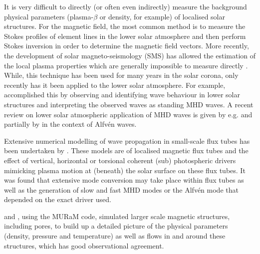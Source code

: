     It is very difficult to directly (or often even indirectly) measure the background physical parameters (plasma-$\beta$ or density, for example) of localised solar structures.
    For the magnetic field, the  most common method is to measure the Stokes profiles of element lines in the lower solar atmosphere and then perform Stokes inversion in order to determine the magnetic field vectors.
    More recently, the development of solar magneto-seismology (SMS) has allowed the estimation of the local plasma properties which are generally impossible to measure directly \citep{Andries2009,Ruderman2009}.
    While, this technique has been used for many years in the solar corona, only recently has it been applied to the lower solar atmosphere.
    For example, \citet{PMHDW} accomplished this by observing and identifying wave behaviour in lower solar structures and interpreting the observed waves as standing MHD waves.
    A recent review on lower solar atmospheric application of MHD waves is given by e.g. \citet{Banerjee2007} and partially by \citet{Mathioudakis2013} in the context of Alfv{\'e}n waves.
    
    Extensive numerical modelling of wave propagation in small-scale flux tubes has been undertaken by \citet{khomenko,hasan2008dynamics,fedun2,fedun1,2011ApJ...730L..24K,2011AnGeo..29..883S,Vigeesh2012,Wedemeyer2012,Mumford2015}.
    These models are of localised magnetic flux tubes and the effect of vertical, horizontal or torsional coherent (sub) photospheric drivers mimicking plasma motion at (beneath) the solar surface on these flux tubes.
    It was found that extensive mode conversion may take place within flux tubes as well as the generation of slow and fast MHD modes or the Alfv{\'e}n mode that depended on the exact driver used.   
    
    \citet{vogler} and \citet{cameron}, using the MURaM code, simulated larger scale magnetic structures, including pores, to build up a detailed picture of the physical parameters (density, pressure and temperature) as well as flows in and around these structures, which has good observational agreement.
    

